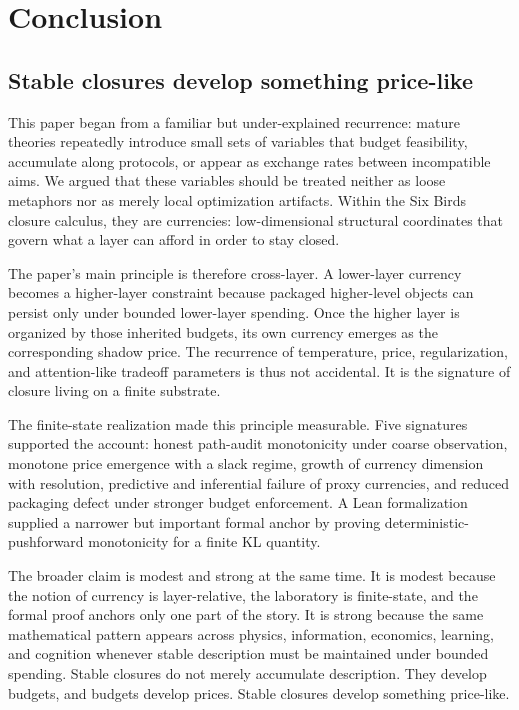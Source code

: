 \section{Conclusion}\label{sec:conclusion}

\subsection{Stable closures develop something price-like}

This paper began from a familiar but under-explained recurrence: mature theories repeatedly introduce small sets of variables that budget feasibility, accumulate along protocols, or appear as exchange rates between incompatible aims. We argued that these variables should be treated neither as loose metaphors nor as merely local optimization artifacts. Within the Six Birds closure calculus, they are currencies: low-dimensional structural coordinates that govern what a layer can afford in order to stay closed.

The paper's main principle is therefore cross-layer. A lower-layer currency becomes a higher-layer constraint because packaged higher-level objects can persist only under bounded lower-layer spending. Once the higher layer is organized by those inherited budgets, its own currency emerges as the corresponding shadow price. The recurrence of temperature, price, regularization, and attention-like tradeoff parameters is thus not accidental. It is the signature of closure living on a finite substrate.

The finite-state realization made this principle measurable. Five signatures supported the account: honest path-audit monotonicity under coarse observation, monotone price emergence with a slack regime, growth of currency dimension with resolution, predictive and inferential failure of proxy currencies, and reduced packaging defect under stronger budget enforcement. A Lean formalization supplied a narrower but important formal anchor by proving deterministic-pushforward monotonicity for a finite KL quantity.

The broader claim is modest and strong at the same time. It is modest because the notion of currency is layer-relative, the laboratory is finite-state, and the formal proof anchors only one part of the story. It is strong because the same mathematical pattern appears across physics, information, economics, learning, and cognition whenever stable description must be maintained under bounded spending. Stable closures do not merely accumulate description. They develop budgets, and budgets develop prices. Stable closures develop something price-like.
